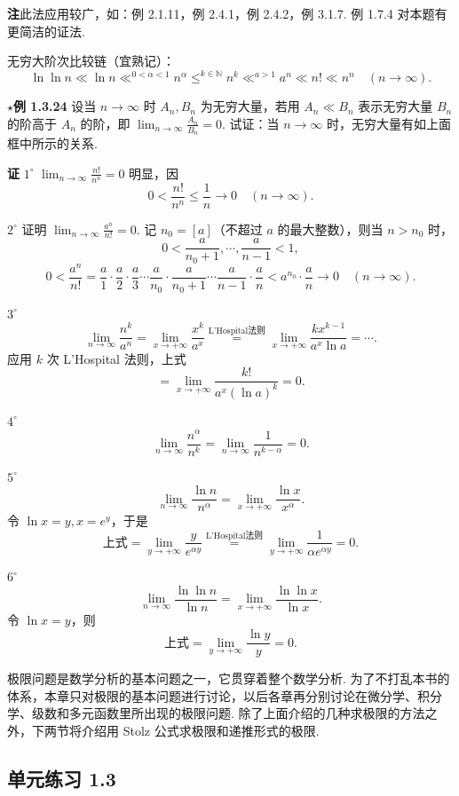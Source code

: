 \documentclass[UTF8,12pt,a4paper,fontset=fandol]{ctexart}
\begin{document}
\noindent\textbf{注}\quad 此法应用较广，如：例 2.1.11，例 2.4.1，例 2.4.2，例 3.1.7.
例 1.7.4 对本题有更简洁的证法.

无穷大阶次比较链（宜熟记）：
\[
  \boxed{\ln\ln n\ll \ln n \mathop{\ll}^{0<\alpha<1} n^\alpha
  \mathop{\le}^{k\in\mathbb N} n^k
  \mathop{\ll}^{a>1} a^n\ll n!\ll n^n\quad(n\to\infty).}
\]

\noindent\textbf{$\star$例 1.3.24}\quad
设当 $n\to\infty$ 时 $A_n,B_n$ 为无穷大量，若用 $A_n\ll B_n$ 表示无穷大量 $B_n$ 的阶高于 $A_n$ 的阶，即
$\displaystyle\lim_{n\to\infty}\frac{A_n}{B_n}=0$. 试证：当 $n\to\infty$ 时，无穷大量有如上面框中所示的关系.

\noindent\textbf{证}\quad
$1^\circ$ $\displaystyle\lim_{n\to\infty}\frac{n!}{n^n}=0$ 明显，因
\[
  0<\frac{n!}{n^n}\le\frac1n\to0\quad(n\to\infty).
\]

$2^\circ$ 证明 $\displaystyle\lim_{n\to\infty}\frac{a^n}{n!}=0$. 记 $n_0=[a]$（不超过 $a$ 的最大整数），则当 $n>n_0$ 时，
\[
  0<\frac a{n_0+1},\cdots,\frac a{n-1}<1,
\]
\[
  0<\frac{a^n}{n!}
  =\frac a1\cdot\frac a2\cdot\frac a3\cdots
  \frac a{n_0}\cdot\frac a{n_0+1}\cdots
  \frac a{n-1}\cdot\frac an
  <a^{n_0}\cdot\frac an\to0\quad(n\to\infty).
\]

$3^\circ$
\[
  \lim_{n\to\infty}\frac{n^k}{a^n}
  =\lim_{x\to+\infty}\frac{x^k}{a^x}
  \overset{\text{L'Hospital法则}}{=}
  \lim_{x\to+\infty}\frac{kx^{k-1}}{a^x\ln a}=\cdots.
\]
应用 $k$ 次 L'Hospital 法则，上式
\[
  =\lim_{x\to+\infty}\frac{k!}{a^x(\ln a)^k}=0.
\]

$4^\circ$
\[
  \lim_{n\to\infty}\frac{n^\alpha}{n^k}
  =\lim_{n\to\infty}\frac1{n^{k-\alpha}}=0.
\]

$5^\circ$
\[
  \lim_{n\to\infty}\frac{\ln n}{n^\alpha}
  =\lim_{x\to+\infty}\frac{\ln x}{x^\alpha}.
\]
令 $\ln x=y,x=e^y$，于是
\[
  \text{上式}=\lim_{y\to+\infty}\frac{y}{e^{\alpha y}}
  \overset{\text{L'Hospital法则}}{=}
  \lim_{y\to+\infty}\frac1{\alpha e^{\alpha y}}=0.
\]

$6^\circ$
\[
  \lim_{n\to\infty}\frac{\ln\ln n}{\ln n}
  =\lim_{x\to+\infty}\frac{\ln\ln x}{\ln x}.
\]
令 $\ln x=y$，则
\[
  \text{上式}=\lim_{y\to+\infty}\frac{\ln y}{y}=0.
\]

极限问题是数学分析的基本问题之一，它贯穿着整个数学分析. 为了不打乱本书的体系，本章只对极限的基本问题进行讨论，以后各章再分别讨论在微分学、积分学、级数和多元函数里所出现的极限问题. 除了上面介绍的几种求极限的方法之外，下两节将介绍用 Stolz 公式求极限和递推形式的极限.

\subsection*{单元练习 1.3}
\end{document}
